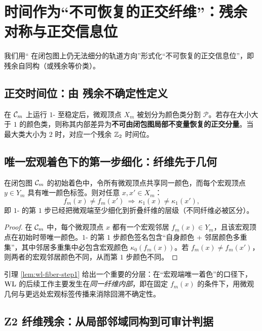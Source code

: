 
\section{时间作为“不可恢复的正交纤维”：残余对称与正交信息位}

我们用“\WL{} 在闭包图上仍无法细分的轨道方向”形式化“不可恢复的正交信息位”，即残余自同构（或残余等价类）。

\subsection{正交时间位：由 \WL{} 残余不确定性定义}

\begin{definition}[\WL{} 残余不确定性]
在 $\mathcal{C}_m$ 上运行 $1$-\WL{} 至稳定后，微观顶点 $X_m$ 被划分为颜色类分割 $\mathcal{P}$。若存在大小大于 $1$ 的颜色类，则称其内部差异为\textbf{不可由闭包图局部不变量恢复的正交分量}。当最大类大小为 $2$ 时，对应一个残余 $\mathbb{Z}_2$ 时间位。
\end{definition}

\subsection{唯一宏观着色下的第一步细化：纤维先于几何}

\begin{lemma}[第 1 步按折叠纤维分组]\label{lem:wl-fiber-step1}
在闭包图 $\mathcal{C}_m$ 的初始着色中，令所有微观顶点共享同一颜色，而每个宏观顶点 $y\in Y_m$ 具有唯一颜色标签。则对任意 $x,x'\in X_m$：
\[
f_m(x)\ne f_m(x')\ \Longrightarrow\ \kappa_1(x)\ne \kappa_1(x'),
\]
即 $1$-\WL{} 的第 $1$ 步已经把微观端至少细化到折叠纤维的层级（不同纤维必被区分）。
\end{lemma}

\begin{proof}
在 $\mathcal{C}_m$ 中，每个微观顶点 $x$ 都有一个宏观邻居 $f_m(x)\in Y_m$，且该宏观顶点在初始时带唯一颜色。$1$-\WL{} 的第 $1$ 步颜色签名包含“自身颜色 + 邻居颜色多重集”，其中邻居多重集中必包含宏观颜色 $\kappa_0(f_m(x))$。若 $f_m(x)\ne f_m(x')$，则两者的宏观邻居颜色不同，从而第 $1$ 步颜色不同。
\end{proof}

\begin{remark}
引理 \ref{lem:wl-fiber-step1} 给出一个重要的分层：在“宏观端唯一着色”的口径下，$\mathrm{WL}{}$ 的后续工作主要发生在\emph{同一纤维内部}，即在固定 $f_m(x)$ 的条件下，用微观几何与更远处宏观标签传播来消除回溯不确定性。
\end{remark}

\subsection{Z2 纤维残余：从局部邻域同构到可审计判据}

